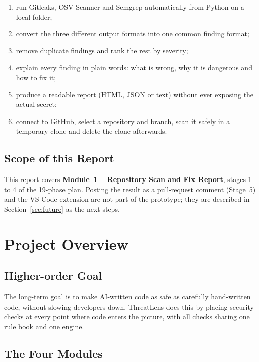 \documentclass[12pt,a4paper]{article}
\begin{document}
\begin{enumerate}
    \item run Gitleaks, OSV-Scanner and Semgrep automatically from Python on a local folder;
    \item convert the three different output formats into one common finding format;
    \item remove duplicate findings and rank the rest by severity;
    \item explain every finding in plain words: what is wrong, why it is dangerous and how to fix it;
    \item produce a readable report (HTML, JSON or text) without ever exposing the actual secret;
    \item connect to GitHub, select a repository and branch, scan it safely in a temporary clone and delete the clone afterwards.
\end{enumerate}

\subsection{Scope of this Report}

This report covers \textbf{Module~1 -- Repository Scan and Fix Report}, stages 1 to 4 of the 19-phase plan. Posting the result as a pull-request comment (Stage~5) and the VS Code extension are not part of the prototype; they are described in Section~\ref{sec:future} as the next steps.

\section{Project Overview}

\subsection{Higher-order Goal}

The long-term goal is to make AI-written code as safe as carefully hand-written code, without slowing developers down. ThreatLens does this by placing security checks at every point where code enters the picture, with all checks sharing one rule book and one engine.

\subsection{The Four Modules}
\end{document}
